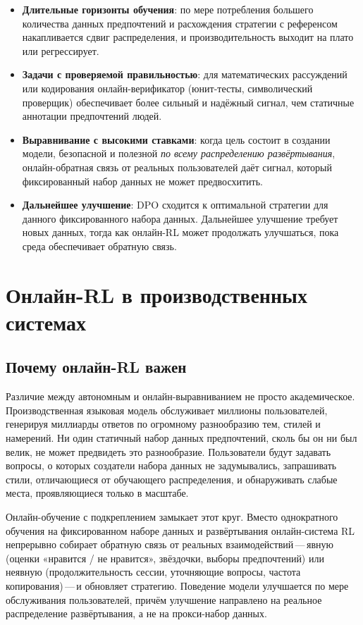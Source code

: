 \begin{itemize}[leftmargin=*]
  \item \textbf{Длительные горизонты обучения}: по мере потребления большего количества данных предпочтений и расхождения стратегии с референсом накапливается сдвиг распределения, и производительность выходит на плато или регрессирует.
  \item \textbf{Задачи с проверяемой правильностью}: для математических рассуждений или кодирования онлайн-верификатор (юнит-тесты, символический проверщик) обеспечивает более сильный и надёжный сигнал, чем статичные аннотации предпочтений людей.
  \item \textbf{Выравнивание с высокими ставками}: когда цель состоит в создании модели, безопасной и полезной \emph{по всему распределению развёртывания}, онлайн-обратная связь от реальных пользователей даёт сигнал, который фиксированный набор данных не может предвосхитить.
  \item \textbf{Дальнейшее улучшение}: DPO сходится к оптимальной стратегии для данного фиксированного набора данных. Дальнейшее улучшение требует новых данных, тогда как онлайн-RL может продолжать улучшаться, пока среда обеспечивает обратную связь.
\end{itemize}

\section{Онлайн-RL в производственных системах}
\label{sec:online-rl-production}

\subsection{Почему онлайн-RL важен}

Различие между автономным и онлайн-выравниванием не просто академическое. Производственная языковая модель обслуживает миллионы пользователей, генерируя миллиарды ответов по огромному разнообразию тем, стилей и намерений. Ни один статичный набор данных предпочтений, сколь бы он ни был велик, не может предвидеть это разнообразие. Пользователи будут задавать вопросы, о которых создатели набора данных не задумывались, запрашивать стили, отличающиеся от обучающего распределения, и обнаруживать слабые места, проявляющиеся только в масштабе.

Онлайн-обучение с подкреплением замыкает этот круг. Вместо однократного обучения на фиксированном наборе данных и развёртывания онлайн-система RL непрерывно собирает обратную связь от реальных взаимодействий\,---\,явную (оценки «нравится / не нравится», звёздочки, выборы предпочтений) или неявную (продолжительность сессии, уточняющие вопросы, частота копирования)\,---\,и обновляет стратегию. Поведение модели улучшается по мере обслуживания пользователей, причём улучшение направлено на реальное распределение развёртывания, а не на прокси-набор данных.

